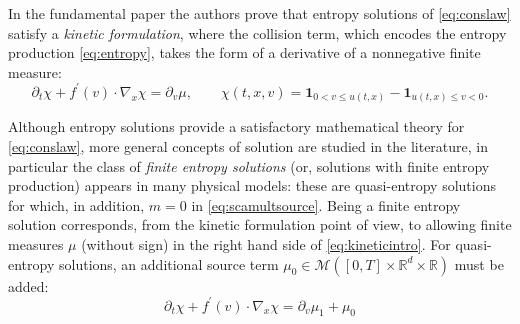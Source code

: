 \documentclass[11pt, twoside, reqno]{amsart}
\theoremstyle{definition}
\theoremstyle{remark}
\numberwithin{equation}{section}
\newcommand{\msc}[1]{\mathscr{#1}}
\begin{document}
In the fundamental paper \cite{LPT_kinetic} the authors prove that entropy solutions of \eqref{eq:conslaw} satisfy a \textit{kinetic formulation}, where the collision term, which encodes the entropy production \eqref{eq:entropy}, takes the form of a derivative of a nonnegative finite measure:
\begin{equation}\label{eq:kineticintro}
\partial_t \chi + f^{\prime}(v) \cdot \nabla_x \chi = \partial_v \mu, \qquad \chi(t, x, v) = \mathbf{1}_{0 < v \leq u(t, x)}-\mathbf{1}_{u(t, x) \leq v < 0} .
\end{equation}

Although entropy solutions provide a satisfactory mathematical theory for \eqref{eq:conslaw}, more general concepts of solution are studied in the literature, in particular the class of \textit{finite entropy solutions} (or, solutions with finite entropy production) appears in many physical models: these are quasi-entropy solutions for which, in addition, $m = 0$ in \eqref{eq:scamultsource}. Being a finite entropy solution corresponds, from the kinetic formulation point of view, to allowing finite measures $\mu$ (without sign) in the right hand side of \eqref{eq:kineticintro}. For quasi-entropy solutions, an additional source term $\mu_0 \in \msc M([0,T] \times \mathbb R^d \times \mathbb R)$ must be added:
\begin{equation}\label{eq:kinmu0intro}
    \partial_t \chi + f^{\prime}(v) \cdot \nabla_x \chi = \partial_v \mu_1 + \mu_0
\end{equation}
\end{document}
